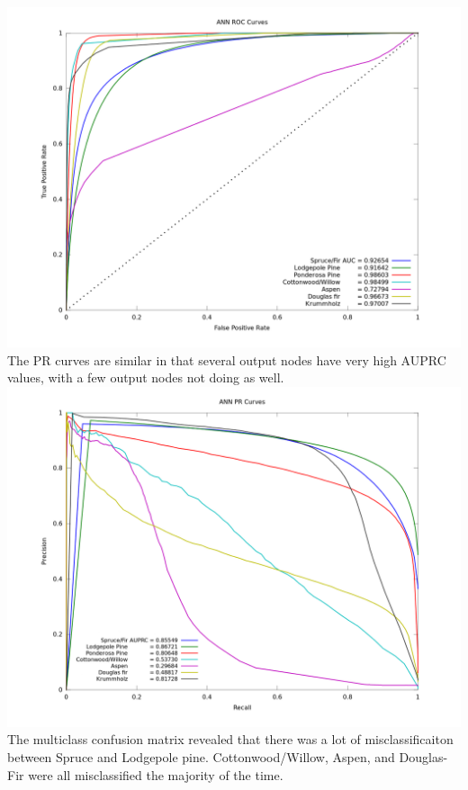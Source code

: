 \documentclass[11pt]{article}
\begin{document}
\includegraphics[width=\linewidth]{images/ROC_comp.png}
The PR curves are similar in that several output nodes have very high AUPRC values, with a few output nodes not doing as well. \\
\includegraphics[width=\linewidth]{images/PR_comp.png} 
The multiclass confusion matrix revealed that there was a lot of misclassificaiton between Spruce and Lodgepole pine.  Cottonwood/Willow, Aspen, and Douglas-Fir were all misclassified the majority of the time.
\end{document}
